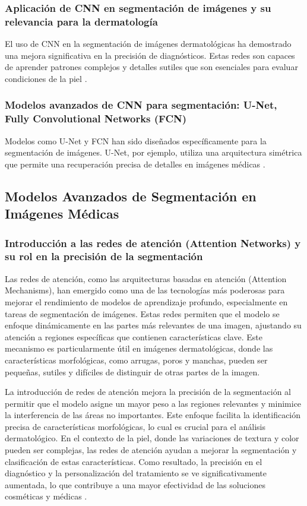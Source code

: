 \subsubsection{Aplicación de CNN en segmentación de imágenes y su relevancia para la dermatología}
El uso de CNN en la segmentación de imágenes dermatológicas ha demostrado una mejora significativa en la precisión de diagnósticos. Estas redes son capaces de aprender patrones complejos y detalles sutiles que son esenciales para evaluar condiciones de la piel \cite{esteva2017}.

\subsubsection{Modelos avanzados de CNN para segmentación: U-Net, Fully Convolutional Networks (FCN)}
Modelos como U-Net y FCN han sido diseñados específicamente para la segmentación de imágenes. U-Net, por ejemplo, utiliza una arquitectura simétrica que permite una recuperación precisa de detalles en imágenes médicas \cite{ronneberger2015}.

\subsection{Modelos Avanzados de Segmentación en Imágenes Médicas}
%
\subsubsection{Introducción a las redes de atención (Attention Networks) y su rol en la precisión de la segmentación}
Las redes de atención, como las arquitecturas basadas en atención (Attention Mechanisms), han emergido como una de las tecnologías más poderosas para mejorar el rendimiento de modelos de aprendizaje profundo, especialmente en tareas de segmentación de imágenes. Estas redes permiten que el modelo se enfoque dinámicamente en las partes más relevantes de una imagen, ajustando su atención a regiones específicas que contienen características clave. Este mecanismo es particularmente útil en imágenes dermatológicas, donde las características morfológicas, como arrugas, poros y manchas, pueden ser pequeñas, sutiles y difíciles de distinguir de otras partes de la imagen.

La introducción de redes de atención mejora la precisión de la segmentación al permitir que el modelo asigne un mayor peso a las regiones relevantes y minimice la interferencia de las áreas no importantes. Este enfoque facilita la identificación precisa de características morfológicas, lo cual es crucial para el análisis dermatológico. En el contexto de la piel, donde las variaciones de textura y color pueden ser complejas, las redes de atención ayudan a mejorar la segmentación y clasificación de estas características. Como resultado, la precisión en el diagnóstico y la personalización del tratamiento se ve significativamente aumentada, lo que contribuye a una mayor efectividad de las soluciones cosméticas y médicas \cite{wang2018}.

